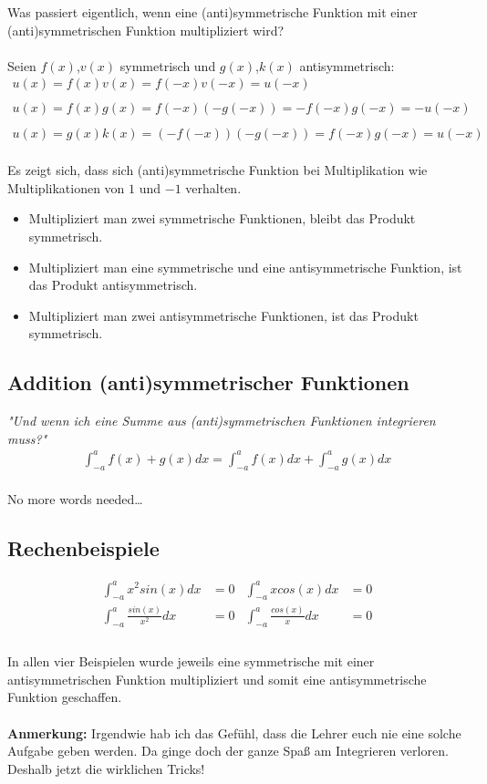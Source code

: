  Was passiert eigentlich, wenn eine (anti)symmetrische Funktion mit einer (anti)symmetrischen Funktion multipliziert wird?\\
 \\
 Seien $f(x)$,$v(x)$ symmetrisch und $g(x)$,$k(x)$ antisymmetrisch:\\
 \begin{align*}
 u(x)=f(x) v(x) = f(-x) v(-x) = u(-x)\\
 \\
 u(x)=f(x) g(x) = f(-x) (-g(-x)) = - f(-x) g(-x) = -u(-x)\\
 \\
 u(x)=g(x) k(x) = (-f(-x)) (-g(-x)) = f(-x) g(-x) = u(-x)
 \end{align*}\\
 Es zeigt sich, dass sich (anti)symmetrische Funktion bei Multiplikation wie Multiplikationen von $1$ und $-1$ verhalten.\\
 \begin{itemize}{}{}
 	 \item Multipliziert man zwei symmetrische Funktionen, bleibt das Produkt symmetrisch.
 	 \item Multipliziert man eine symmetrische und eine antisymmetrische Funktion, ist das Produkt antisymmetrisch.
 	 \item Multipliziert man zwei antisymmetrische Funktionen, ist das Produkt symmetrisch.
 \end{itemize}

\subsection{Addition (anti)symmetrischer Funktionen}
\textit{"Und wenn ich eine Summe aus (anti)symmetrischen Funktionen integrieren muss?"}\\

\begin{align*}
\int_{-a}^{a} f(x) + g(x) dx = \int_{-a}^{a} f(x) dx + \int_{-a}^{a} g(x) dx  
\end{align*}\\
No more words needed\dots\\
\subsection{Rechenbeispiele}
\begin{align*}
\int_{-a}^{a} x^{2} sin(x) dx &= 0 & \int_{-a}^{a} x cos(x) dx &= 0\\
\int_{-a}^{a} \frac{sin(x)}{x^{2}} dx &= 0 & \int_{-a}^{a} \frac{cos(x)}{x} dx &= 0\\
\end{align*}\\
In allen vier Beispielen wurde jeweils eine symmetrische mit einer antisymmetrischen Funktion multipliziert und somit eine antisymmetrische Funktion geschaffen.\\
\\
\textbf{Anmerkung:} Irgendwie hab ich das Gefühl, dass die Lehrer euch nie eine solche Aufgabe geben werden. Da ginge doch der ganze Spaß am Integrieren verloren. Deshalb jetzt die wirklichen Tricks!